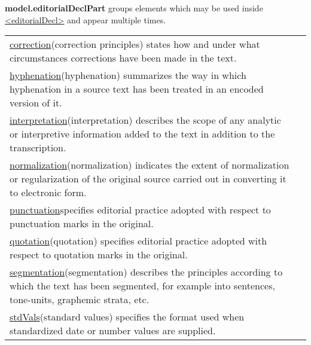 \begin{sansreflist}
\item [\textbf{model.editorialDeclPart}] groups elements which may be used inside \hyperref[TEI.editorialDecl]{<editorialDecl>} and appear multiple times. \par 
\begin{longtable}{P{0.21336032388663964\textwidth}P{0.6366396761133603\textwidth}}
\hyperref[TEI.correction]{correction}\tabcellsep (correction principles) states how and under what circumstances corrections have been made in the text.\\
\hyperref[TEI.hyphenation]{hyphenation}\tabcellsep (hyphenation) summarizes the way in which hyphenation in a source text has been treated in an encoded version of it.\\
\hyperref[TEI.interpretation]{interpretation}\tabcellsep (interpretation) describes the scope of any analytic or interpretive information added to the text in addition to the transcription.\\
\hyperref[TEI.normalization]{normalization}\tabcellsep (normalization) indicates the extent of normalization or regularization of the original source carried out in converting it to electronic form.\\
\hyperref[TEI.punctuation]{punctuation}\tabcellsep specifies editorial practice adopted with respect to punctuation marks in the original.\\
\hyperref[TEI.quotation]{quotation}\tabcellsep (quotation) specifies editorial practice adopted with respect to quotation marks in the original.\\
\hyperref[TEI.segmentation]{segmentation}\tabcellsep (segmentation) describes the principles according to which the text has been segmented, for example into sentences, tone-units, graphemic strata, etc.\\
\hyperref[TEI.stdVals]{stdVals}\tabcellsep (standard values) specifies the format used when standardized date or number values are supplied.\end{longtable} \par
 

\end{sansreflist}
